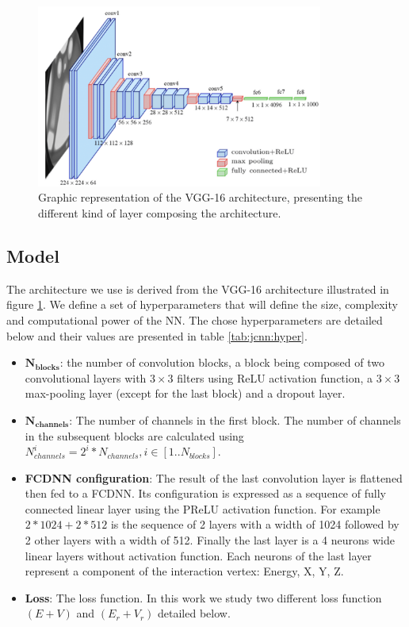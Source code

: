 \begin{figure}[ht]
  \centering
  \includegraphics[height=6cm]{images/jcnn/vgg16.png}
  \caption{Graphic representation of the VGG-16 architecture, presenting the different kind of layer composing the architecture.}
  \label{fig:jcnn:vgg16}
\end{figure}

\subsection{Model}
\label{sec:jcnn:model}

The architecture we use is derived from the VGG-16 architecture \cite{simonyan_very_2015} illustrated in figure \ref{fig:jcnn:vgg16}. We define a set of hyperparameters that will define the size, complexity and computational power of the NN. The chose hyperparameters are detailed below and their values are presented in table \ref{tab:jcnn:hyper}.
\begin{itemize}
  \item $\mathbf{N_{blocks}}$: the number of convolution blocks, a block being composed of two convolutional layers with $3\times3$ filters using ReLU activation function, a $3\times3$ max-pooling layer (except for the last block) and a dropout layer.
  \item $\mathbf{N_{channels}}$: The number of channels in the first block. The number of channels in the subsequent blocks are calculated using $N^i_{channels} = 2^{i} * N_{channels}, i \in [1..N_{blocks}]$.
  \item \textbf{FCDNN configuration}: The result of the last convolution layer is flattened then fed to a FCDNN. Its configuration is expressed as a sequence of fully connected linear layer using the PReLU activation function. For example $2 * 1024 + 2 * 512$ is the sequence of 2 layers with a width of 1024 followed by 2 other layers with a width of 512. Finally the last layer is a 4 neurons wide linear layers without activation function. Each neurons of the last layer represent a component of the interaction vertex: Energy, X, Y, Z.
  \item \textbf{Loss}: The loss function. In this work we study two different loss function $(E+V)$ and $(E_r + V_r)$ detailed below.
\end{itemize}


